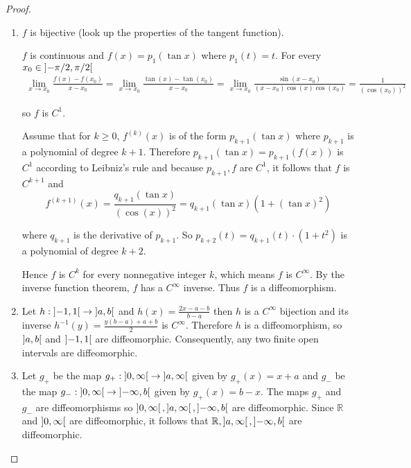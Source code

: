 \begin{proof}
	\begin{enumerate}[label={(\alph*)}]
		\item \( f \) is bijective (look up the properties of the tangent function).

		      \( f \) is continuous and \( f(x) = p_{1}(\tan x) \) where \( p_{1}(t) = t \). For every \( x_{0} \in \left]{-\pi/2,\pi/2}\right[ \)
		      \begin{align*}
			      \lim\limits_{x\to x_{0}}\frac{f(x) - f(x_{0})}{x - x_{0}} = \lim\limits_{x\to x_{0}}\frac{\tan(x) - \tan(x_{0})}{x - x_{0}} = \lim\limits_{x\to x_{0}}\frac{\sin(x - x_{0})}{(x - x_{0})\cos(x)\cos(x_{0})} = \frac{1}{{(\cos(x_{0}))}^{2}}
		      \end{align*}

		      so \( f \) is \( C^{1} \).

		      Assume that for \( k \ge 0 \), \( f^{(k)}(x) \) is of the form \( p_{k+1}(\tan x) \) where \( p_{k+1} \) is a polynomial of degree \( k+1 \). Therefore \( p_{k+1}(\tan x) = p_{k+1}(f(x)) \) is \( C^{1} \) according to Leibniz's rule and because \( p_{k+1}, f \) are \( C^{1} \), it follows that \( f \) is \( C^{k+1} \) and
		      \[
			      f^{(k+1)}(x) = \frac{q_{k+1}(\tan x)}{{(\cos(x))}^{2}} = q_{k+1}(\tan x)(1 + {(\tan x)}^{2})
		      \]

		      where \( q_{k+1} \) is the derivative of \( p_{k+1} \). So \( p_{k+2}(t) = q_{k+1}(t)\cdot (1 + t^{2}) \) is a polynomial of degree \( k + 2 \).

		      Hence \( f \) is \( C^{k} \) for every nonnegative integer \( k \), which means \( f \) is \( C^{\infty} \). By the inverse function theorem, \( f \) has a \( C^{\infty} \) inverse. Thus \( f \) is a diffeomorphism.
		\item Let \( h: \left]{-1, 1}\right[ \to \left]{a, b}\right[ \) and \( h(x) = \frac{2x - a - b}{b - a} \) then \( h \) is a \( C^{\infty} \) bijection and its inverse \( h^{-1}(y) = \frac{y(b - a) + a + b}{2} \) is \( C^{\infty} \). Therefore \( h \) is a diffeomorphism, so \( \left]{a, b}\right[ \) and \( \left]{-1, 1}\right[ \) are diffeomorphic. Consequently, any two finite open intervals are diffeomorphic.
		\item Let \( g_{+} \) be the map \( g_{+}: \left]{0, \infty}\right[ \to \left]{a, \infty}\right[ \) given by \( g_{+}(x) = x + a \) and \( g_{-} \) be the map \( g_{-}: \left]{0, \infty}\right[ \to \left]{-\infty, b}\right[ \) given by \( g_{+}(x) = b - x \). The maps \( g_{+} \) and \( g_{-} \) are diffeomorphisms so \( \left]{0, \infty}\right[, \left]{a, \infty}\right[, \left]{-\infty, b}\right[ \) are diffeomorphic. Since \( \mathbb{R} \) and \( \left]{0, \infty}\right[ \) are diffeomorphic, it follows that \( \mathbb{R}, \left]{a, \infty}\right[, \left]{-\infty, b}\right[ \) are diffeomorphic.
	\end{enumerate}
\end{proof}

